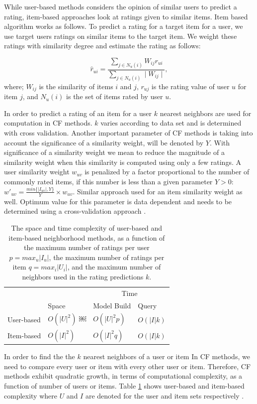 \documentclass[conference]{IEEEtran}
\begin{document}
While user-based methods considers the opinion of similar users to predict a rating, 
item-based approaches look at ratings given to similar items. Item based algorithm 
works as follows. To predict a rating for a target item for a user, we use target users
ratings on similar items to the target item. We weight these ratings with similarity 
degree and estimate the rating as follows:

\[
\hat{r}_{ui} = \frac{\sum\limits_{j \in N_u(i)} W_{ij}r_{ui}}{\sum\limits_{j \in N_u(i)} \mid W_{ij} \mid},
\]
where; $W_{ij}$ is the similarity of items $i$ and $j$, $r_{uj}$ is the rating value 
of user $u$ for item $j$, and $N_u(i)$ is the set of items rated by user $u$.

In order to predict a rating of an item for a user $k$ nearest neighbors are 
used for computation in CF methods. $k$ varies according to data set and is 
determined with cross validation. Another important parameter of CF methods 
is taking into account the significance of a similarity weight, will be denoted 
by $Y$. With significance of a similarity weight we mean to reduce the magnitude 
of a similarity weight when this similarity is computed using only a few 
ratings. A user similarity weight $w_{uv}$ is penalized by a factor proportional to the number 
of commonly rated items, if this number is less than a given parameter $Y > 0$:
$w'_{uv} = \frac {min\{|I_{uv}|, Y \} } Y \times w_{uv}$. Similar approach used for an item
similarity weight as well. Optimum value for this parameter is 
data dependent and needs to be determined using a cross-validation approach
 \cite{DBLP:reference/rsh/DesrosiersK11}.

\begin{table}
\centering
\begin{tabular}{llll}
\hline
& & \multicolumn {2}{c}{Time} \\
\cline{3-4}
     & Space & Model Build  & Query \\
\hline
User-based & $O(|U|^2)$ ￼& $O(|U|^2 p)$ &$O(|I|k)$ \\
Item-based & $O(|I|^2)$ & $O(|I|^2q)$ & $O(|I|k)$   \\
\hline
\end{tabular}
\caption{The space and time complexity of user-based and item-based 
neighborhood methods, as a function of the maximum number of ratings per user
$p = max_{u}|I_{u}|$, the maximum number of ratings per item 
$q = max_{i}|U_{i}|$, and the maximum number of neighbors used in the rating
predictions $k$.}
\label{table:complexity}
\end{table}
In order to find the the $k$ nearest neighbors of a user or item In CF methods, 
we need to compare every user or item with every other user or item. 
Therefore, CF methods exhibit quadratic growth,  in terms of computational 
complexity,  as a function of number of users or items. Table \ref{table:complexity} 
shows user-based and item-based complexity where $U$ and $I$ are denoted for 
the user and item sets respectively \cite{DBLP:reference/rsh/DesrosiersK11}.
\end{document}
